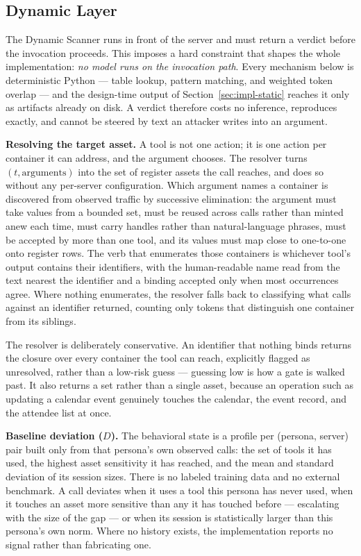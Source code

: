 \documentclass[sigconf]{acmart}
\begin{document}
\subsection{Dynamic Layer}
\label{sec:impl-dynamic}

The Dynamic Scanner runs in front of the server and must return a verdict
before the invocation proceeds. This imposes a hard constraint that shapes the
whole implementation: \emph{no model runs on the invocation path}. Every
mechanism below is deterministic Python --- table lookup, pattern matching, and
weighted token overlap --- and the design-time output of
Section~\ref{sec:impl-static} reaches it only as artifacts already on disk. A
verdict therefore costs no inference, reproduces exactly, and cannot be steered
by text an attacker writes into an argument.

\textbf{Resolving the target asset.} A tool is not one action; it is one action
per container it can address, and the argument chooses. The resolver turns
$(t, \text{arguments})$ into the set of register assets the call reaches, and
does so without any per-server configuration. Which argument names a container
is discovered from observed traffic by successive elimination: the argument
must take values from a bounded set, must be reused across calls rather than
minted anew each time, must carry handles rather than natural-language phrases,
must be accepted by more than one tool, and its values must map close to
one-to-one onto register rows. The verb that enumerates those containers is
whichever tool's output contains their identifiers, with the human-readable name
read from the text nearest the identifier and a binding accepted only when most
occurrences agree. Where nothing enumerates, the resolver falls back to
classifying what calls against an identifier returned, counting only tokens that
distinguish one container from its siblings.

The resolver is deliberately conservative. An identifier that nothing binds
returns the closure over every container the tool can reach, explicitly flagged
as unresolved, rather than a low-risk guess --- guessing low is how a gate is
walked past. It also returns a set rather than a single asset, because an
operation such as updating a calendar event genuinely touches the calendar, the
event record, and the attendee list at once.

\textbf{Baseline deviation ($D$).} The behavioral state is a profile per
(persona, server) pair built only from that persona's own observed calls: the
set of tools it has used, the highest asset sensitivity it has reached, and the
mean and standard deviation of its session sizes. There is no labeled training
data and no external benchmark. A call deviates when it uses a tool this persona
has never used, when it touches an asset more sensitive than any it has touched
before --- escalating with the size of the gap --- or when its session is
statistically larger than this persona's own norm. Where no history exists, the
implementation reports no signal rather than fabricating one.
\end{document}
